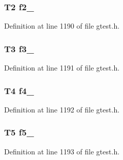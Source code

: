 \hypertarget{classstd_1_1tr1_1_1tuple_aa127058e0f6093d8d1cad10d8aa4e713}{
\subsubsection[{f2\-\_\-}]{\setlength{\rightskip}{0pt plus 5cm}\-T2 {\bf f2\-\_\-}}}\label{d7/d6d/classstd_1_1tr1_1_1tuple_aa127058e0f6093d8d1cad10d8aa4e713}


\-Definition at line 1190 of file gtest.\-h.

\hypertarget{classstd_1_1tr1_1_1tuple_a4c07c01e90d50a2a6678e9c8c820bdf4}{
\subsubsection[{f3\-\_\-}]{\setlength{\rightskip}{0pt plus 5cm}\-T3 {\bf f3\-\_\-}}}\label{d7/d6d/classstd_1_1tr1_1_1tuple_a4c07c01e90d50a2a6678e9c8c820bdf4}


\-Definition at line 1191 of file gtest.\-h.

\hypertarget{classstd_1_1tr1_1_1tuple_aa5e925e415c418cb0517dcdca3f403ad}{
\subsubsection[{f4\-\_\-}]{\setlength{\rightskip}{0pt plus 5cm}\-T4 {\bf f4\-\_\-}}}\label{d7/d6d/classstd_1_1tr1_1_1tuple_aa5e925e415c418cb0517dcdca3f403ad}


\-Definition at line 1192 of file gtest.\-h.

\hypertarget{classstd_1_1tr1_1_1tuple_a958de1bea4fa35ad0859360efa2bd9fb}{
\subsubsection[{f5\-\_\-}]{\setlength{\rightskip}{0pt plus 5cm}\-T5 {\bf f5\-\_\-}}}\label{d7/d6d/classstd_1_1tr1_1_1tuple_a958de1bea4fa35ad0859360efa2bd9fb}


\-Definition at line 1193 of file gtest.\-h.


